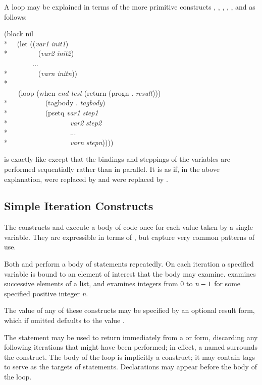 \begin{defmac}
A  loop may be explained in terms of the more primitive constructs
, , , , ,
and  as follows:
\begin{lisp}
(block nil \\*
~~(let ((\emph{var1} \emph{init1}) \\*
~~~~~~~~(\emph{var2} \emph{init2}) \\
~~~~~~~~... \\*
~~~~~~~~(\emph{varn} \emph{initn})) \\*
~~~~ \\
~~~~(loop (when \emph{end-test} (return (progn . \emph{result}))) \\*
~~~~~~~~~~(tagbody . \emph{tagbody}) \\*
~~~~~~~~~~(psetq \emph{var1} \emph{step1} \\*
~~~~~~~~~~~~~~~~~\emph{var2} \emph{step2} \\*
~~~~~~~~~~~~~~~~~... \\*
~~~~~~~~~~~~~~~~~\emph{varn} \emph{stepn}))))
\end{lisp}
 is exactly like  except that the bindings and steppings
of the variables are performed sequentially rather than in parallel.
It is as if, in the above explanation,
 were replaced by  and  were replaced
by .
\end{defmac}

\subsection{Simple Iteration Constructs}

The constructs  and  execute a body of code
once for each value taken by a single variable.  They are expressible
in terms of , but capture very common patterns of use.

Both  and  perform
a body of statements repeatedly.  On each iteration a specified
variable is bound to an element of interest that the body may
examine.   examines successive elements of a list,
and  examines integers from 0 to $\emph{n}-1$
for some specified positive integer \emph{n}.

The value of any of these constructs may be specified by an optional result
form, which if omitted defaults to the value {\false}.

The  statement may be used to return
immediately from a  or  form,
discarding any following iterations
that might have been performed; in effect, a  named {\nil}
surrounds the construct.
The body of the loop is implicitly a  construct;
it may contain tags to serve as the targets of  statements.
Declarations may appear before the body of the loop.

